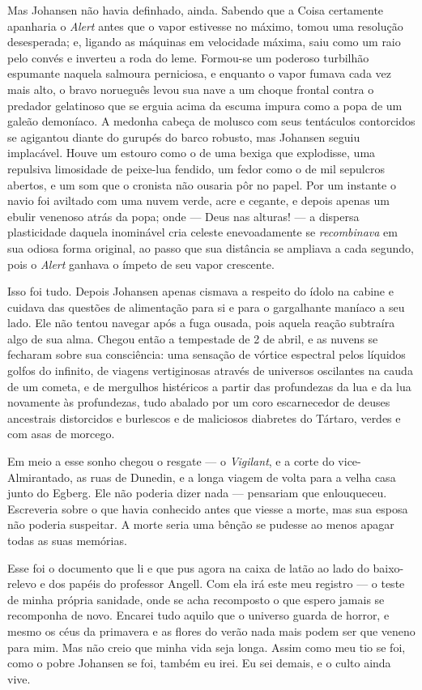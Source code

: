 Mas Johansen não havia definhado, ainda. Sabendo que a Coisa certamente
apanharia o \emph{Alert} antes que o vapor estivesse no máximo, tomou
uma resolução desesperada; e, ligando as máquinas em velocidade máxima,
saiu como um raio pelo convés e inverteu a roda do leme. Formou-se um
poderoso turbilhão espumante naquela salmoura perniciosa, e enquanto o
vapor fumava cada vez mais alto, o bravo norueguês levou sua nave a um
choque frontal contra o predador gelatinoso que se erguia acima da
escuma impura como a popa de um galeão demoníaco. A medonha cabeça de
molusco com seus tentáculos contorcidos se agigantou diante do gurupés
do barco robusto, mas Johansen seguiu implacável. Houve um estouro como
o de uma bexiga que explodisse, uma repulsiva limosidade de peixe-lua
fendido, um fedor como o de mil sepulcros abertos, e um som que o
cronista não ousaria pôr no papel. Por um instante o navio foi aviltado
com uma nuvem verde, acre e cegante, e depois apenas um ebulir venenoso
atrás da popa; onde --- Deus nas alturas! --- a dispersa plasticidade
daquela inominável cria celeste enevoadamente se \emph{recombinava} em
sua odiosa forma original, ao passo que sua distância se ampliava a cada
segundo, pois o \emph{Alert} ganhava o ímpeto de seu vapor crescente.

Isso foi tudo. Depois Johansen apenas cismava a respeito do ídolo na
cabine e cuidava das questões de alimentação para si e para o
gargalhante maníaco a seu lado. Ele não tentou navegar após a fuga
ousada, pois aquela reação subtraíra algo de sua alma. Chegou então a
tempestade de 2 de abril, e as nuvens se fecharam sobre sua consciência:
uma sensação de vórtice espectral pelos líquidos golfos do infinito, de
viagens vertiginosas através de universos oscilantes na cauda de um
cometa, e de mergulhos histéricos a partir das profundezas da lua e da
lua novamente às profundezas, tudo abalado por um coro escarnecedor de
deuses ancestrais distorcidos e burlescos e de maliciosos diabretes do
Tártaro, verdes e com asas de morcego.

Em meio a esse sonho chegou o resgate
--- o \emph{Vigilant}, e a corte
do vice-Almirantado, as ruas de Dunedin, e a longa viagem de volta para
a velha casa junto do Egberg. Ele não poderia dizer nada --- pensariam
que enlouqueceu. Escreveria sobre o que havia conhecido antes que viesse
a morte, mas sua esposa não poderia suspeitar. A morte seria uma bênção
se pudesse ao menos apagar todas as suas memórias.

Esse foi o documento que li e que pus agora na caixa de latão ao lado
do baixo-relevo e dos papéis do professor Angell. Com ela irá este meu
registro --- o teste de minha própria sanidade, onde se acha recomposto
o que espero jamais se recomponha de novo. Encarei tudo aquilo que o
universo guarda de horror, e mesmo os céus da primavera e as flores do
verão nada mais podem ser que veneno para mim. Mas não creio que minha
vida seja longa. Assim como meu tio se foi, como o pobre Johansen se
foi, também eu irei. Eu sei demais, e o culto ainda vive.

